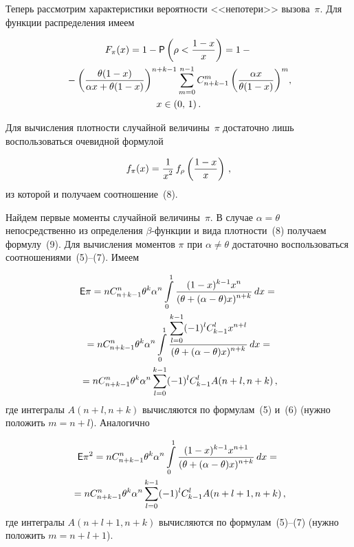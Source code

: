 \begin{multicols}{2}
Теперь рассмотрим характеристики вероятности <<непотери>> вызова~$\pi$. Для функции распределения имеем

\vspace*{-2pt}

\noindent
\begin{multline*}
F_\pi(x)=1-{\sf P}\left(\rho<\displaystyle\frac{\displaystyle 1-x\mathstrut}{\displaystyle x\mathstrut}\right)=
1-{}\\
{}-
\left(\displaystyle\frac{\displaystyle \theta(1-x)\mathstrut}{\displaystyle \alpha
x+\theta(1-x)\mathstrut}\right)^{n+k-1}\sum\limits_{m=0}^{n-1}C_{n+k-1}^m\left(\displaystyle\frac{\displaystyle \alpha x\mathstrut}{\displaystyle \theta(1-x)\mathstrut}\right)^m\!,\\
x\in(0,\,1)\,.
\end{multline*}

Для вычисления плотности случайной величины~$\pi$ достаточно лишь воспользоваться очевидной формулой

\vspace*{-2pt}

\noindent
$$
f_\pi(x)=\displaystyle\frac{\displaystyle 1\mathstrut}{\displaystyle x^2\mathstrut}\,f_\rho\left(\displaystyle\frac{\displaystyle 1-x\mathstrut}{\displaystyle x\mathstrut}\right)\,,
$$
из которой и получаем соотношение~(8).

Найдем первые моменты случайной величины~$\pi$. В случае $\alpha=\theta$ непосредственно из определения $\beta$-функции
и вида плотности~(8) получаем формулу~(9). Для вычисления моментов $\pi$ при $\alpha\neq\theta$
достаточно воспользоваться соотношениями~(5)--(7). Имеем

\vspace*{-2pt}

\noindent
\begin{multline*}
{\sf E}\pi=nC_{n+k-1}^n\theta^k\alpha^n\int\limits_0^1\displaystyle\frac{\displaystyle (1-x)^{k-1}x^{n}\mathstrut}{\displaystyle (\theta+(\alpha-\theta)x)^{n+k}\mathstrut}\, dx={}\\
{}=
nC_{n+k-1}^n\theta^k\alpha^n\int\limits_0^1\displaystyle\frac{\displaystyle \sum_{l=0}^{k-1}(-1)^lC_{k-1}^lx^{n+l}\mathstrut}{\displaystyle (\theta+
(\alpha-\theta)x)^{n+k}\mathstrut}\,dx={}\\
{}=
nC_{n+k-1}^n\theta^k\alpha^n\sum_{l=0}^{k-1}(-1)^lC_{k-1}^lA(n+l,n+k)\,,
\end{multline*} %
где интегралы $A(n+l,n+k)$ вычисляются по формулам~(5) и~(6) (нужно положить $m=n+l$).
Аналогично

\vspace*{-6pt}

\noindent
\begin{multline*}
{\sf E}\pi^2=nC_{n+k-1}^n\theta^k\alpha^n\int\limits_{0}^{1}\displaystyle\frac{\displaystyle (1-x)^{k-1}x^{n+1}\mathstrut}{\displaystyle (\theta+(\alpha-\theta)x)^{n+k}\mathstrut}\, dx={}\\
{}
=nC_{n+k-1}^n\theta^k\alpha^n\sum_{l=0}^{k-1}(-1)^lC_{k-1}^lA(n+l+1,n+k)\,,
\end{multline*}
где интегралы $A(n+l+1,n+k)$ вычисляются по формулам~(5)--(7) (нужно положить $m=n+l+1$).


\end{multicols}

